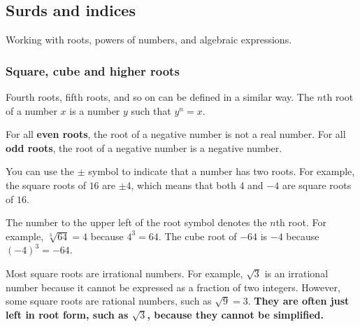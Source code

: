 \subsection{Surds and indices}

Working with roots, powers of numbers, and algebraic expressions.

\subsubsection{Square, cube and higher roots}



Fourth roots, fifth roots, and so on can be defined in a similar way. The $n$th root of a number $x$ is a number $y$ such that $y^n = x$.


For all \textbf{even roots}, the root of a negative number is not a real number. For all \textbf{odd roots}, the root of a negative number is a negative number.

You can use the $\pm$ symbol to indicate that a number has two roots. For example, the square roots of $16$ are $\pm 4$, which means that both $4$ and $-4$ are square roots of $16$.


The number to the upper left of the root symbol denotes the $n$th root. For example, $\sqrt[3]{64} = 4$ because $4^3 = 64$. The cube root of $-64$ is $-4$ because $(-4)^3 = -64$.

Most square roots are irrational numbers. For example, $\sqrt{3}$ is an irrational number because it cannot be expressed as a fraction of two integers. However, some square roots are rational numbers, such as $\sqrt{9} = 3$. \textbf{They are often just left in root form, such as $\sqrt{3}$, because they cannot be simplified.}

